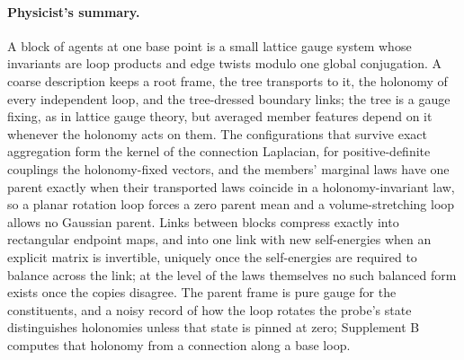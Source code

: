 \paragraph{Physicist's summary.}
A block of agents at one base point is a small lattice gauge system whose invariants are loop products and
edge twists modulo one global conjugation. A coarse description keeps a root frame, the tree transports to
it, the holonomy of every independent loop, and the tree-dressed boundary links; the tree is a gauge
fixing, as in lattice gauge theory, but averaged member features depend on it whenever the holonomy acts
on them. The configurations that survive exact aggregation form the kernel of the connection Laplacian,
for positive-definite couplings the holonomy-fixed vectors, and the members' marginal laws have one parent
exactly when their transported laws coincide in a holonomy-invariant law, so a planar rotation loop forces
a zero parent mean and a volume-stretching loop allows no Gaussian parent. Links between blocks compress
exactly into rectangular endpoint maps, and into one link with new self-energies when an explicit matrix is
invertible, uniquely once the self-energies are required to balance across the link; at the level of the
laws themselves no such balanced form exists once the copies disagree. The parent frame is
pure gauge for the constituents, and a noisy record of
how the loop rotates the probe's state distinguishes holonomies unless that state is pinned at zero;
Supplement B computes that holonomy from a connection along a base loop.
